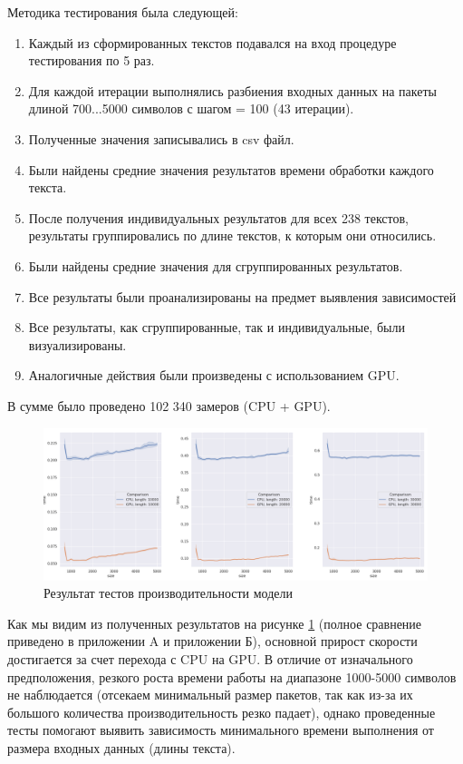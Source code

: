 Методика тестирования была следующей:
\begin{enumerate}
  \item Каждый из сформированных текстов подавался на вход процедуре тестирования по 5 раз.
  \item Для каждой итерации выполнялись разбиения входных данных на пакеты длиной 700...5000 символов с шагом = 100 (43 итерации).
  \item Полученные значения записывались в csv файл.
  \item Были найдены средние значения результатов времени обработки каждого текста. 
  \item После получения индивидуальных результатов для всех 238 текстов, результаты группировались по длине текстов, к которым они относились.
  \item Были найдены средние значения для сгруппированных результатов. 
  \item Все результаты были проанализированы на предмет выявления зависимостей

  \item Все результаты, как сгруппированные, так и индивидуальные, были визуализированы.
  \item Аналогичные действия были произведены с использованием GPU. 
\end{enumerate}

В сумме было проведено 102 340 замеров (CPU + GPU).

\begin{figure}[ht]
\centering
\includegraphics[width=\textwidth]{img/in_text_compare}
\caption{\label{fig:in_text_compare}Результат тестов производительности модели}
\end{figure}

Как мы видим из полученных результатов на рисунке \ref{fig:in_text_compare} (полное сравнение приведено в приложении A и приложении Б), основной прирост скорости достигается за счет перехода с CPU на GPU. В отличие от изначального предположения, резкого роста времени работы на диапазоне 1000-5000 символов не наблюдается (отсекаем минимальный размер пакетов, так как из-за их большого количества производительность резко падает), однако проведенные тесты помогают выявить зависимость минимального времени выполнения от размера входных данных (длины текста). 

